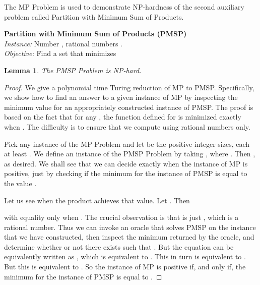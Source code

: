 \documentclass[letterpaper,11pt]{article}
\newtheorem{lemma}[theorem]{Lemma}
\newcommand{\remove}[1]{}
\newcommand{\FF}{\vspace*{\medskipamount}}
\begin{document}
The MP Problem is used to demonstrate NP-hardness of the second auxiliary problem called Partition with Minimum Sum of Products.

\FF
\noindent
{\bf Partition with Minimum Sum of Products (PMSP)}\\
{\it Instance:} Number , rational numbers  .\\
{\it Objective:} Find a set  that minimizes
 
\FF

\begin{lemma}
The PMSP Problem is NP-hard.
\end{lemma}

\remove{**********************
\begin{proof}[Proof sketch.]
The proof is based on the fact that for any , the function  defined for  is minimized exactly when . We avoid using irrational numbers by selecting the  appropriately.
\end{proof}
**********************}

\begin{proof}
We give a polynomial time Turing reduction of MP to PMSP. Specifically, we show how to find an answer to a given instance of MP by inspecting the minimum value for an appropriately constructed instance of PMSP. The proof is based on the fact that for any , the function  defined for  is minimized exactly when . The difficulty is to ensure that we compute using rational numbers only.

Pick any instance of the MP Problem and let  be the positive integer sizes, each at least . We define an instance of the PMSP Problem by taking , where . Then , as desired. 
We shall see that we can decide exactly when the instance of MP is positive, just by checking if the minimum for the instance of PMSP is equal to the value .

Let us see when the product  achieves that value. Let . Then

with equality only when . The crucial observation is that  is just , which is a rational number. Thus we can invoke an oracle that solves PMSP on the instance that we have constructed, then inspect the minimum returned by the oracle, and determine whether or not there exists  such that . But the equation can be equivalently written as
, which is equivalent to . This in turn is equivalent to . But this is equivalent to 
. So 
the instance of MP is positive if, and only if, the minimum for the instance of PMSP is equal to 
.
\end{proof}
\end{document}
